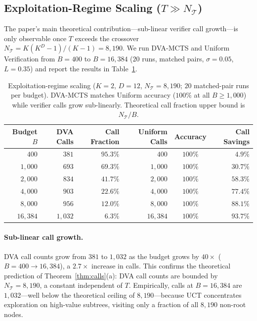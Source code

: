 \subsection{Exploitation-Regime Scaling ($T \gg N_{\mathcal{T}}$)}
\label{sec:exploitation_results}

The paper's main theoretical contribution---sub-linear verifier call growth---is
only observable once $T$ exceeds the crossover $N_{\mathcal{T}} = K(K^D-1)/(K-1) = 8{,}190$.
We run DVA-MCTS and Uniform Verification from $B{=}400$ to $B{=}16{,}384$ ($20$ runs,
matched pairs, $\sigma{=}0.05$, $L{=}0.35$) and report the results in
Table~\ref{tab:exploitation}.

\begin{table}[t]
\centering
\caption{Exploitation-regime scaling ($K{=}2$, $D{=}12$, $N_{\mathcal{T}}{=}8{,}190$;
  $20$ matched-pair runs per budget).  DVA-MCTS matches Uniform accuracy
  ($100\%$ at all $B \geq 1{,}000$) while verifier calls grow sub-linearly.
  Theoretical call fraction upper bound is $N_{\mathcal{T}}/B$.}
\label{tab:exploitation}
\begin{tabular}{rrrrcr}
\toprule
Budget $B$ & DVA Calls & Call Fraction & Uniform Calls & Accuracy & Call Savings \\
\midrule
$400$    & $381$ & $95.3\%$ & $400$ & $100\%$ & $4.9\%$ \\
$1{,}000$ & $693$ & $69.3\%$ & $1{,}000$ & $100\%$ & $30.7\%$ \\
$2{,}000$ & $834$ & $41.7\%$ & $2{,}000$ & $100\%$ & $58.3\%$ \\
$4{,}000$ & $903$ & $22.6\%$ & $4{,}000$ & $100\%$ & $77.4\%$ \\
$8{,}000$ & $956$ & $12.0\%$ & $8{,}000$ & $100\%$ & $88.1\%$ \\
$16{,}384$ & $1{,}032$ & $6.3\%$ & $16{,}384$ & $100\%$ & $\mathbf{93.7\%}$ \\
\bottomrule
\end{tabular}
\end{table}

\paragraph{Sub-linear call growth.}
DVA call counts grow from $381$ to $1{,}032$ as the budget grows by $40\times$
($B{=}400 \to 16{,}384$), a $2.7\times$ increase in calls.
This confirms the theoretical prediction of Theorem~\ref{thm:calls}(a): DVA call
counts are bounded by $N_{\mathcal{T}} = 8{,}190$, a constant independent of $T$.
Empirically, calls at $B{=}16{,}384$ are $1{,}032$---well below the theoretical
ceiling of $8{,}190$---because UCT concentrates exploration on high-value subtrees,
visiting only a fraction of all $8{,}190$ non-root nodes.

